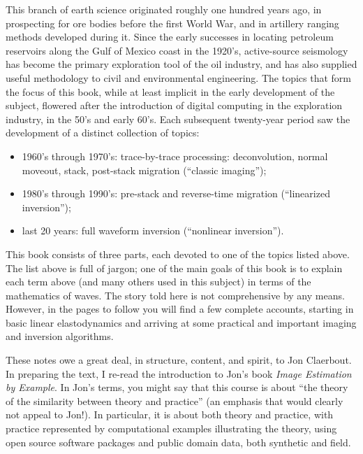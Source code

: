 This branch of earth science originated roughly one hundred years ago, in prospecting for ore bodies before the first World War, and in artillery ranging methods developed during it. Since the early successes in locating petroleum reservoirs along the Gulf of Mexico coast in the 1920's, active-source seismology has become the primary exploration tool of the oil industry, and has also supplied useful methodology to civil and environmental engineering. The topics that form the focus of this book, while at least implicit in the early development of the subject, flowered after the introduction of digital computing in the exploration industry, in the 50's and early 60's. Each subsequent twenty-year period saw the development of a distinct collection of topics:
\begin{itemize}
\item 1960's through 1970's: trace-by-trace processing: deconvolution, normal moveout, stack, post-stack migration (``classic imaging'');
\item 1980's through 1990's: pre-stack and reverse-time migration (``linearized inversion'');
\item last 20 years: full waveform inversion (``nonlinear inversion'').
\end{itemize}
This book consists of three parts, each devoted to one of the topics listed above.
The list above is full of jargon; one of the main goals of this book is to explain each term above (and many others used in this subject) in terms of the mathematics of waves. The story told here is not comprehensive by any means. However, in the pages to follow you will find a few complete accounts, starting in basic linear elastodynamics and arriving at some practical and important imaging and inversion algorithms.  

These notes owe a great deal, in structure, content, and spirit, to Jon Claerbout. In preparing the text, I re-read the introduction to Jon's book {\em Image Estimation by Example}. In Jon's terms, you might say that this course is about ``the theory of the similarity between theory and practice'' (an emphasis that would clearly not appeal to Jon!). In particular, it is about both theory and practice, with practice represented by computational examples illustrating the theory, using open source software packages and public domain data, both synthetic and field.

